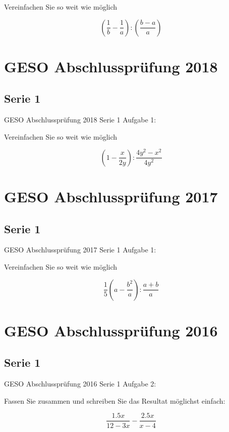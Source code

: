 {Vereinfachen Sie so weit wie möglich

$$\left(\frac1b - \frac1a \right) : \left( \frac{b-a}{a}  \right)$$




\section*{GESO Abschlussprüfung 2018}
\subsection*{Serie 1}
GESO Abschlussprüfung 2018 Serie 1 Aufgabe 1:

Vereinfachen Sie so weit wie möglich

$$\left(1 - \frac{x}{2y} \right) : \frac{4y^2-x^2}{4y^2}$$



\section*{GESO Abschlussprüfung 2017}
\subsection*{Serie 1}
GESO Abschlussprüfung 2017 Serie 1 Aufgabe 1:

Vereinfachen Sie so weit wie möglich

$$\frac15\left( a - \frac{b^2}{a} \right) : \frac{a+b}{a}$$


\section*{GESO Abschlussprüfung 2016}
\subsection*{Serie 1}
GESO Abschlussprüfung 2016 Serie 1 Aufgabe 2:

Fassen Sie zusammen und schreiben Sie das Resultat möglichst einfach:

$$\frac{1.5x}{12-3x} - \frac{2.5x}{x-4}$$

\newpage
}

